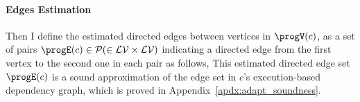 \paragraph*{Edges Estimation}
Then I define the estimated directed edges
between vertices in $\progV(c)$,
as a set of pairs 
$\progE(c) \in \mathcal{P}(\in \mathcal{LV} \times \mathcal{LV})$
indicating a directed edge from the first vertex to the second one in each pair
as follows,
This estimated directed edge set $\progE(c)$ is a sound approximation of the 
edge set in $c$'s execution-based dependency graph, which is proved 
in Appendix~\ref{apdx:adapt_soundness}.
